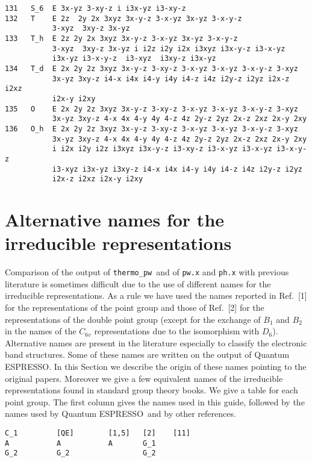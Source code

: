 \documentclass[12pt,a4paper,twoside]{report}
\def\qe{{\sc Quantum ESPRESSO}}
\def\tpw{\texttt{thermo\_pw}}
\begin{document}
\begin{tcolorbox}
\begin{footnotesize}
\begin{verbatim}
131   S_6  E 3x-yz 3-xy-z i i3x-yz i3-xy-z  
132   T    E 2z  2y 2x 3xyz 3x-y-z 3-x-yz 3x-yz 3-x-y-z 
           3-xyz  3xy-z 3x-yz 
133   T_h  E 2z 2y 2x 3xyz 3x-y-z 3-x-yz 3x-yz 3-x-y-z 
           3-xyz  3xy-z 3x-yz i i2z i2y i2x i3xyz i3x-y-z i3-x-yz 
           i3x-yz i3-x-y-z  i3-xyz  i3xy-z i3x-yz 
134   T_d  E 2x 2y 2z 3xyz 3x-y-z 3-xy-z 3-x-yz 3-x-yz 3-x-y-z 3-xyz
           3x-yz 3xy-z i4-x i4x i4-y i4y i4-z i4z i2y-z i2yz i2x-z i2xz 
           i2x-y i2xy
135   O    E 2x 2y 2z 3xyz 3x-y-z 3-xy-z 3-x-yz 3-x-yz 3-x-y-z 3-xyz
           3x-yz 3xy-z 4-x 4x 4-y 4y 4-z 4z 2y-z 2yz 2x-z 2xz 2x-y 2xy
136   O_h  E 2x 2y 2z 3xyz 3x-y-z 3-xy-z 3-x-yz 3-x-yz 3-x-y-z 3-xyz
           3x-yz 3xy-z 4-x 4x 4-y 4y 4-z 4z 2y-z 2yz 2x-z 2xz 2x-y 2xy
           i i2x i2y i2z i3xyz i3x-y-z i3-xy-z i3-x-yz i3-x-yz i3-x-y-z 
           i3-xyz i3x-yz i3xy-z i4-x i4x i4-y i4y i4-z i4z i2y-z i2yz 
           i2x-z i2xz i2x-y i2xy
\end{verbatim}
\end{footnotesize}
\end{tcolorbox}

\newpage
{\color{dark-blue}\chapter{Alternative names for the irreducible 
representations}}
\color{black}

Comparison of the output of \tpw\ and of \texttt{pw.x} and \texttt{ph.x} 
with previous literature is sometimes difficult due to the use of different 
names for the irreducible representations. As a rule we have used the names
reported in Ref.~[1] for the representations of the point group and those
of Ref.~[2] for the representations of the double point group
(except for the exchange of $B_1$ and $B_2$ in the names of the $C_{6v}$ 
representations due to the isomorphism with $D_6$). Alternative
names are present in the literature especially to classify the electronic
band structures. Some of these names are written on the output
of \qe. In this Section we describe the origin of these names pointing to
the original papers. Moreover we give a few equivalent names of the irreducible representations found in standard 
group theory books. 
We give a table for each point group. The first column gives the names 
used in this guide, followed by the names used by \qe\ and by 
other references.

\begin{tcolorbox}
\begin{footnotesize}
\begin{verbatim}
C_1         [QE]        [1,5]   [2]    [11]
A           A           A       G_1             
G_2         G_2                 G_2              
\end{verbatim}
\end{footnotesize}
\end{tcolorbox}
\end{document}
